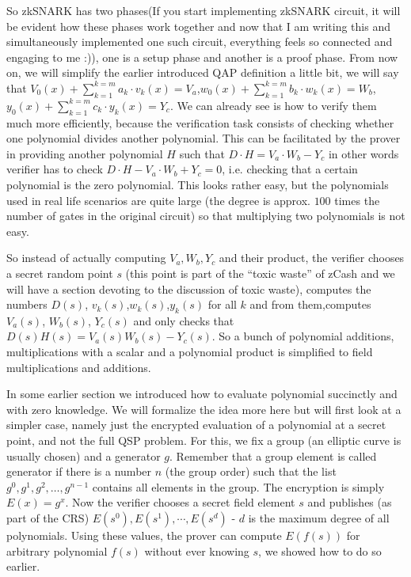 \documentclass[12pt,letterpaper]{article}
\begin{document}
So zkSNARK has two phases(If you start implementing zkSNARK circuit, it will be evident how these phases work together and now that I am writing this and simultaneously implemented one such circuit, everything feels so connected and engaging to me :)), one is a setup phase and another is a proof phase. From now on, we will simplify the earlier introduced QAP definition a little bit, we will say that $V_0 (x) + \sum_{k = 1}^ {k=m}a_k\cdot v_k(x)=V_a$,$w_0 (x) + \sum_{k = 1} ^{k= m}b_k\cdot w_k(x)=W_b$,$y_0(x)+\sum_{k = 1}^{k=m}c_k\cdot y_k (x)=Y_c$. We can already see is how to verify them much more efficiently, because the verification task consists of checking whether one polynomial divides another polynomial. This can be facilitated by the prover in providing another polynomial $H$ such that $D\cdot H=V_a\cdot W_b-Y_c$ in other words verifier has to check  $D\cdot H-V_a\cdot W_b+Y_c=0$, i.e. checking that a certain polynomial is the zero polynomial. This looks rather easy, but the polynomials used in real life scenarios are quite large (the degree is approx. $100$ times the number of gates in the original circuit) so that multiplying two polynomials is not easy.

So instead of actually computing $V_a,W_b,Y_c$ and their product, the verifier chooses a secret random point $s$ (this point is part of the “toxic waste” of zCash and we will have a section devoting to the discussion of toxic waste), computes the numbers $D(s)$, $v_k(s)$,$w_k(s)$,$y_k(s)$ for all $k$ and from them,computes  $V_a(s)$, $W_b(s)$, $Y_c(s)$ and only checks that $D(s)H(s) = V_a(s)W_b(s)-Y_c(s)$. So a bunch of polynomial additions, multiplications with a scalar and a polynomial product is simplified to field multiplications and additions.

In some earlier section we introduced how to evaluate polynomial succinctly and with zero knowledge. We will formalize the idea more here but will first look at a simpler case, namely just the encrypted evaluation of a polynomial at a secret point, and not the full QSP problem. For this, we fix a group (an elliptic curve is usually chosen) and a generator $g$. Remember that a group element is called generator if there is a number $n$ (the group order) such that the list $g^0, g^1, g^2, …, g^{n-1}$ contains all elements in the group. The encryption is simply $E(x)= g^x$. Now the verifier chooses a secret field element $s$ and publishes (as part of the CRS) $E(s^0), E(s^1),\cdots , E(s^d)$ - $d$ is the maximum degree of all polynomials. Using these values, the prover can compute $E(f(s))$ for arbitrary polynomial $f(s)$ without ever knowing $s$, we showed how to do so earlier.
\end{document}
